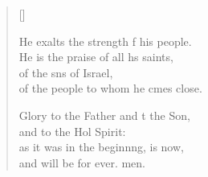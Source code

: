 \begin{verse}[\versewidth]
\begin{patverse}
He exalts the strength f his people.\Med\\
    He is the praise of all h\pointup{\i}s saints,\\
of the sns of Israel,\Med\\
    of the people to whom he cmes close.

Glory to the Father and t the Son,\Med\\
    and to the Hol Spirit:\\
as it was in the beginn\pointup{\i}ng, is now,\Med\\
    and will be for ever. men.
  \end{patverse}
\end{verse}
